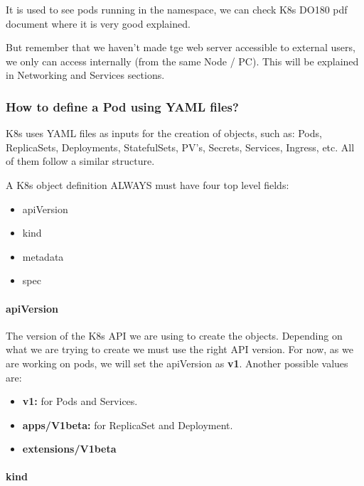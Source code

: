 \documentclass{article}
\newenvironment{blocktemplateIII}[1]{%
    \tcolorbox[beamer,%
    noparskip,breakable,
    ,colframe=Red,%
    colbacklower=LimeGreen!75!LightGreen,%
    title=#1]}%
    {\endtcolorbox}
\begin{document}
It is used to see pods running in the namespace, we can check K8s DO180 pdf document where it is very good explained.

But remember that we haven't made tge web server accessible to external users, we only can access internally (from the same Node / PC). This will be explained in Networking and Services sections.

\subsubsection{How to define a Pod using YAML files?}

K8s uses YAML files as inputs for the creation of objects, such as: Pods, ReplicaSets, Deployments, StatefulSets, PV's, Secrets, Services, Ingress, etc. All of them follow a similar structure.

\begin{blocktemplateIII}{Note}
A K8s object definition ALWAYS must have four top level fields:
\begin{itemize}
    \item apiVersion
    \item kind
    \item metadata
    \item spec
\end{itemize}
\end{blocktemplateIII}

\paragraph{apiVersion}

The version of the K8s API we are using to create the objects. Depending on what we are trying to create we must use the right API version. For now, as we are working on pods, we will set the apiVersion as \textbf{v1}. Another possible values are:

\begin{itemize}
    \item \textbf{v1:} for Pods and Services.
    \item \textbf{apps/V1beta:} for ReplicaSet and Deployment.
    \item \textbf{extensions/V1beta}
\end{itemize}

\paragraph{kind}
\end{document}
